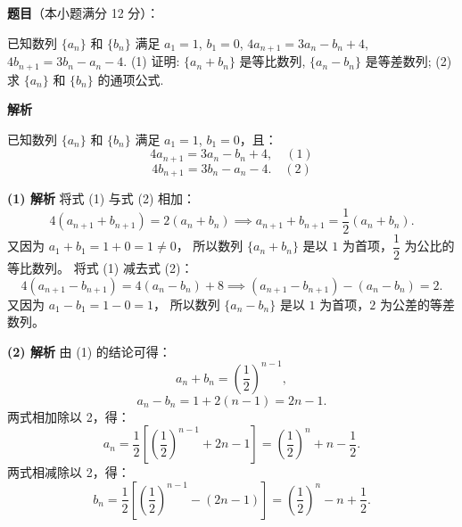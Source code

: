\begin{answer}

\textbf{题目}（本小题满分 12 分）：

已知数列 $\{a_n\}$ 和 $\{b_n\}$ 满足 $a_1 = 1$, $b_1 = 0$, $4a_{n+1} = 3a_n - b_n + 4$, $4b_{n+1} = 3b_n - a_n - 4$.
(1) 证明: $\{a_n + b_n\}$ 是等比数列, $\{a_n - b_n\}$ 是等差数列;
(2) 求 $\{a_n\}$ 和 $\{b_n\}$ 的通项公式.

\textbf{解析}

已知数列 $\{a_n\}$ 和 $\{b_n\}$ 满足 $a_1 = 1$, $b_1 = 0$，且：
\nopagebreak[4]
\[4a_{n+1} = 3a_n - b_n + 4, \quad (1)\]
\nopagebreak[4]
\[4b_{n+1} = 3b_n - a_n - 4. \quad (2)\]

\textbf{(1) 解析}
将式 (1) 与式 (2) 相加：
\nopagebreak[4]
\[4(a_{n+1} + b_{n+1}) = 2(a_n + b_n) \implies a_{n+1} + b_{n+1} = \frac{1}{2}(a_n + b_n).\]
又因为 $a_1 + b_1 = 1 + 0 = 1 \neq 0$，
所以数列 $\{a_n + b_n\}$ 是以 $1$ 为首项，$\dfrac{1}{2}$ 为公比的等比数列。
将式 (1) 减去式 (2)：
\nopagebreak[4]
\[4(a_{n+1} - b_{n+1}) = 4(a_n - b_n) + 8 \implies (a_{n+1} - b_{n+1}) - (a_n - b_n) = 2.\]
又因为 $a_1 - b_1 = 1 - 0 = 1$，
所以数列 $\{a_n - b_n\}$ 是以 $1$ 为首项，$2$ 为公差的等差数列。

\textbf{(2) 解析}
由 (1) 的结论可得：
\nopagebreak[4]
\[a_n + b_n = \left(\frac{1}{2}\right)^{n-1},\]
\nopagebreak[4]
\[a_n - b_n = 1 + 2(n-1) = 2n - 1.\]
两式相加除以 2，得：
\nopagebreak[4]
\[a_n = \frac{1}{2}\left[\left(\frac{1}{2}\right)^{n-1} + 2n - 1\right] = \left(\frac{1}{2}\right)^n + n - \frac{1}{2}.\]
两式相减除以 2，得：
\nopagebreak[4]
\[b_n = \frac{1}{2}\left[\left(\frac{1}{2}\right)^{n-1} - (2n - 1)\right] = \left(\frac{1}{2}\right)^n - n + \frac{1}{2}.\]



\end{answer}
